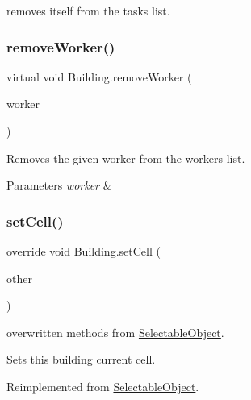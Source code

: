 removes itself from the tasks list. 

\mbox{\label{class_building_aad4618cbe489fbfc99282ff8ec77297b}} 
\subsubsection{\texorpdfstring{remove\+Worker()}{removeWorker()}}
{\footnotesize\ttfamily virtual void Building.\+remove\+Worker (\begin{DoxyParamCaption}\item[{Game\+Object}]{worker }\end{DoxyParamCaption})\hspace{0.3cm}{\ttfamily [virtual]}}



Removes the given worker from the workers list. 


\begin{DoxyParams}{Parameters}
{\em worker} & \\
\hline
\end{DoxyParams}
\mbox{\label{class_building_a81f0e7df4171d3508afefe8deac1eea6}} 
\subsubsection{\texorpdfstring{set\+Cell()}{setCell()}}
{\footnotesize\ttfamily override void Building.\+set\+Cell (\begin{DoxyParamCaption}\item[{\mbox{\hyperlink{class_selectable_object}{Selectable\+Object}}}]{other }\end{DoxyParamCaption})\hspace{0.3cm}{\ttfamily [virtual]}}



overwritten methods from \mbox{\hyperlink{class_selectable_object}{Selectable\+Object}}. 

Sets this building current cell. 

Reimplemented from \mbox{\hyperlink{class_selectable_object_a8d56c05598d677cca9c8b06a774ee5a2}{Selectable\+Object}}.

\mbox{\label{class_building_ac06aa2a8d21f1594e8dda8d391297f8f}} 
